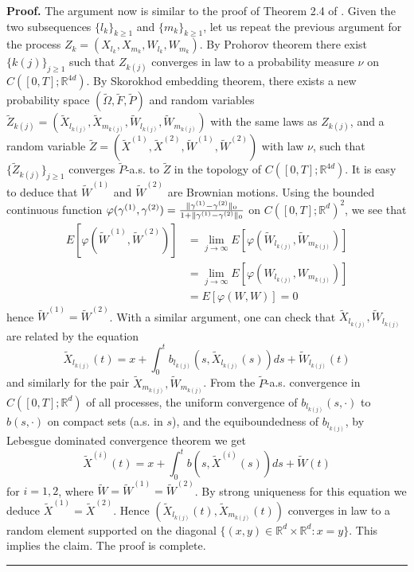 \documentclass[a4paper,11pt]{article}
\newenvironment{proof}[1][Proof]{\textbf{#1.} }{\ \rule{0.5em}{0.5em}}
\begin{document}
\begin{proof}
The argument now is similar to the proof of Theorem 2.4 of \cite{GK}. Given
the two subsequences $\{l_{k}\}_{k\geq 1}$ and $\{m_{k}\}_{k\geq 1}$, let us
repeat the previous argument for the process $%
Z_{k}=(X_{l_{k}},X_{m_{k}},W_{l_{k}},W_{m_{k}})$. By Prohorov theorem there
exist $\{k(j)\}_{j\geq 1}$ such that $Z_{k(j)}$ converges in law to a
probability measure $\nu $ on $C([0,T];\mathbb{R}^{4d})$. By Skorokhod
embedding theorem, there exists a new probability space $(\widetilde{\Omega }%
,\widetilde{F},\widetilde{P})$ and random variables $\widetilde{Z}_{k(j)}=(%
\widetilde{X}_{l_{k(j)}},\widetilde{X}_{m_{k(j)}},\widetilde{W}_{l_{k(j)}},%
\widetilde{W}_{m_{k(j)}})$ with the same laws as $Z_{k(j)}$, and a random
variable $\widetilde{Z}=(\widetilde{X}^{(1)},\widetilde{X}^{(2)},\widetilde{W%
}^{(1)},\widetilde{W}^{(2)})$ with law $\nu $, such that $\{\widetilde{Z}%
_{k(j)}\}_{j\geq 1}$ converges $\widetilde{P}$-a.s. to $\widetilde{Z}$ in
the topology of $C([0,T];\mathbb{R}^{4d})$. It is easy to deduce that $%
\widetilde{W}^{(1)}$ and $\widetilde{W}^{(2)}$ are Brownian motions. Using
the bounded continuous function $\varphi (\gamma ^{(1)},\gamma ^{(2)})=\frac{%
\Vert \gamma ^{(1)}-\gamma ^{(2)}\Vert _{0}}{1+\Vert \gamma ^{(1)}-\gamma
^{(2)}\Vert _{0}}$ on $C([0,T];\mathbb{R}^{d})^{2}$, we see that
\begin{align*}
E[\varphi (\widetilde{W}^{(1)},\widetilde{W}^{(2)})]& =\lim_{j\rightarrow
\infty }E[\varphi (\widetilde{W}_{l_{k(j)}},\widetilde{W}_{m_{k(j)}})] \\
& =\lim_{j\rightarrow \infty }E[\varphi (W_{l_{k(j)}},W_{m_{k(j)}})] \\
& =E[\varphi (W,W)]=0
\end{align*}
hence $\widetilde{W}^{(1)}=\widetilde{W}^{(2)}$. With a similar argument,
one can check that $\widetilde{X}_{l_{k(j)}},\widetilde{W}_{l_{k(j)}}$ are
related by the equation
\begin{equation*}
\widetilde{X}_{l_{k(j)}}(t)=x+\int_{0}^{t}b_{l_{k(j)}}(s,\widetilde{X}%
_{l_{k(j)}}(s))ds+\widetilde{W}_{l_{k(j)}}(t)
\end{equation*}
and similarly for the pair $\widetilde{X}_{m_{k(j)}},\widetilde{W}_{m_{k(j)}}
$. From the $\widetilde{P}$-a.s. convergence in $C([0,T];\mathbb{R}^{d})$ of
all processes, the uniform convergence of $b_{l_{k(j)}}(s,\cdot )$ to $%
b(s,\cdot )$ on compact sets (a.s. in $s$), and the equiboundedness of $%
b_{l_{k(j)}}$, by Lebesgue dominated convergence theorem we get
\begin{equation*}
\widetilde{X}^{(i)}(t)=x+\int_{0}^{t}b(s,\widetilde{X}^{(i)}(s))ds+%
\widetilde{W}(t)
\end{equation*}
for $i=1,2$, where $\widetilde{W}=\widetilde{W}^{(1)}=\widetilde{W}^{(2)}$.
By strong uniqueness for this equation we deduce $\widetilde{X}^{(1)}=%
\widetilde{X}^{(2)}$. Hence $(\widetilde{X}_{l_{k(j)}}(t),\widetilde{X}%
_{m_{k(j)}}(t))$ converges in law to a random element supported on the
diagonal $\{(x,y)\in \mathbb{R}^{d}\times \mathbb{R}^{d}:x=y\}$. This
implies the claim. The proof is complete.
\end{proof}
\end{document}
